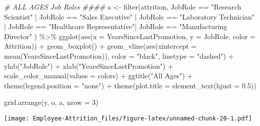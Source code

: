 \documentclass[
]{article}
\newenvironment{Shaded}{\begin{snugshade}}{\end{snugshade}}
\newcommand{\AttributeTok}[1]{\textcolor[rgb]{0.77,0.63,0.00}{#1}}
\newcommand{\CommentTok}[1]{\textcolor[rgb]{0.56,0.35,0.01}{\textit{#1}}}
\newcommand{\DecValTok}[1]{\textcolor[rgb]{0.00,0.00,0.81}{#1}}
\newcommand{\FloatTok}[1]{\textcolor[rgb]{0.00,0.00,0.81}{#1}}
\newcommand{\FunctionTok}[1]{\textcolor[rgb]{0.00,0.00,0.00}{#1}}
\newcommand{\NormalTok}[1]{#1}
\newcommand{\OtherTok}[1]{\textcolor[rgb]{0.56,0.35,0.01}{#1}}
\newcommand{\SpecialCharTok}[1]{\textcolor[rgb]{0.00,0.00,0.00}{#1}}
\newcommand{\StringTok}[1]{\textcolor[rgb]{0.31,0.60,0.02}{#1}}
\begin{document}
\begin{Shaded}
\begin{Highlighting}[]
\CommentTok{\# ALL AGES Job Roles \#\#\#\#}
\NormalTok{a }\OtherTok{\textless{}{-}} \FunctionTok{filter}\NormalTok{(attrition, JobRole }\SpecialCharTok{==} \StringTok{"Research Scientist"} \SpecialCharTok{|}\NormalTok{ JobRole }\SpecialCharTok{==} \StringTok{"Sales Executive"}  \SpecialCharTok{|}\NormalTok{ JobRole }\SpecialCharTok{==} \StringTok{"Laboratory Technician"} \SpecialCharTok{|}\NormalTok{ JobRole }\SpecialCharTok{==} \StringTok{"Healthcare Representative"}\SpecialCharTok{|}\NormalTok{ JobRole }\SpecialCharTok{==} \StringTok{"Manufacturing Director"}\NormalTok{ ) }\SpecialCharTok{\%\textgreater{}\%}
  \FunctionTok{ggplot}\NormalTok{(}\FunctionTok{aes}\NormalTok{(}\AttributeTok{x =}\NormalTok{ YearsSinceLastPromotion, }\AttributeTok{y =}\NormalTok{ JobRole, }\AttributeTok{color =}\NormalTok{ Attrition)) }\SpecialCharTok{+}
  \FunctionTok{geom\_boxplot}\NormalTok{() }\SpecialCharTok{+}
  \FunctionTok{geom\_vline}\NormalTok{(}\FunctionTok{aes}\NormalTok{(}\AttributeTok{xintercept =} \FunctionTok{mean}\NormalTok{(YearsSinceLastPromotion)), }\AttributeTok{color =} \StringTok{"black"}\NormalTok{, }\AttributeTok{linetype =} \StringTok{"dashed"}\NormalTok{) }\SpecialCharTok{+}
  \FunctionTok{ylab}\NormalTok{(}\StringTok{"JobRole"}\NormalTok{) }\SpecialCharTok{+}
  \FunctionTok{xlab}\NormalTok{(}\StringTok{"YearsSinceLastPromotion"}\NormalTok{) }\SpecialCharTok{+}
  \FunctionTok{scale\_color\_manual}\NormalTok{(}\AttributeTok{values =}\NormalTok{ colors) }\SpecialCharTok{+}
  \FunctionTok{ggtitle}\NormalTok{(}\StringTok{"All Ages"}\NormalTok{) }\SpecialCharTok{+}
  \FunctionTok{theme}\NormalTok{(}\AttributeTok{legend.position =} \StringTok{"none"}\NormalTok{) }\SpecialCharTok{+}
  \FunctionTok{theme}\NormalTok{(}\AttributeTok{plot.title =} \FunctionTok{element\_text}\NormalTok{(}\AttributeTok{hjust =} \FloatTok{0.5}\NormalTok{)) }

\FunctionTok{grid.arrange}\NormalTok{(y, o, a, }\AttributeTok{nrow =} \DecValTok{3}\NormalTok{)}
\end{Highlighting}
\end{Shaded}

\texttt{[image: Employee-Attrition\_files/figure-latex/unnamed-chunk-20-1.pdf]}
\end{document}
